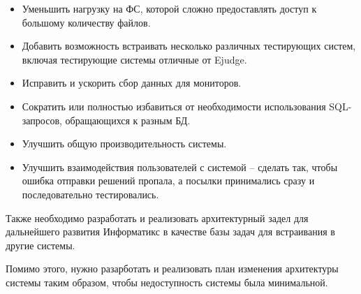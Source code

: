 \begin{itemize}
    \item Уменьшить нагрузку на ФС, которой сложно предоставлять доступ к большому количеству файлов.
    \item Добавить возможность встраивать несколько различных тестирующих систем, включая тестирующие системы отличные от Ejudge.
    \item Исправить и ускорить сбор данных для мониторов.
    \item Сократить или полностью избавиться от необходимости использования SQL-запросов, обращающихся к разным БД.
    \item Улучшить общую производительность системы.
    \item Улучшить взаимодействия пользователей с системой 
    -- сделать так, чтобы ошибка отправки решений пропала,
    а посылки принимались сразу и последовательно тестировались.
\end{itemize}

Также необходимо разработать и реализовать архитектурный задел для дальнейшего развития Информатикс в качестве базы задач для встраивания в другие системы.

Помимо этого, нужно разарботать и реализовать план изменения архитектуры системы таким образом, чтобы недоступность системы была минимальной.